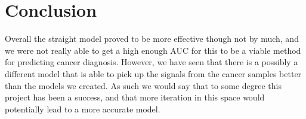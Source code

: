 \chapter{Conclusion}
Overall the straight model proved to be more effective though not by much, and we were not really able to get a high enough AUC for this to be a viable method for predicting cancer diagnosis. However, we have seen that there is a possibly a different model that is able to pick up the signals from the cancer samples better than the models we created. As such we would say that to some degree this project has been a success, and that more iteration in this space would potentially lead to a more accurate model.